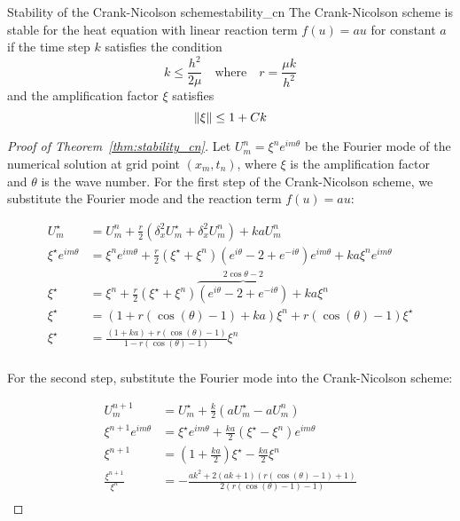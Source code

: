 \begin{theorem}{Stability of the Crank-Nicolson scheme}{stability_cn}
  The Crank-Nicolson scheme is stable for the heat equation with linear reaction term \(f(u) = au\) for constant \(a\) if the time step \(k\) satisfies the condition
  \[
    k \leq \frac{h^2}{2\mu} \quad \text{where} \quad r = \frac{\mu k}{h^2}
  \]
  and the amplification factor \(\xi\) satisfies
  \[
    \lVert\xi\rVert \leq 1 + Ck
  \]
\end{theorem}
\begin{proof}[Proof of Theorem~\ref{thm:stability_cn}]
  Let \(U_m^n = \xi^n e^{i m \theta}\) be the Fourier mode of the numerical solution at grid point \((x_m, t_n)\), where \(\xi\) is the amplification factor and \(\theta\) is the wave number.
  For the first step of the Crank-Nicolson scheme, we substitute the Fourier mode and the reaction term \(f(u) = au\):

  \begin{align*}
    U_m^\star                & = U_m^n + \frac{r}{2} (\delta_x^2 U_m^\star + \delta_x^2 U_m^n) + k a U_m^n                                                                          \\
    \xi^\star e^{i m \theta} & = \xi^n e^{i m \theta} + \frac{r}{2} \left(\xi^\star + \xi^n\right)\left(e^{i\theta} - 2 + e^{-i\theta}\right)e^{im\theta}+ k a \xi^n e^{i m \theta} \\
    \xi^\star                & = \xi^n + \frac{r}{2} \left(\xi^\star + \xi^n \right)\overbrace{\left(e^{i \theta} - 2 + e^{-i \theta}\right)}^{2\cos\theta - 2} + k a \xi^n                                       \\
    \xi^\star                & = (1 + r(\cos(\theta) - 1) + ka) \xi^n + r(\cos(\theta) - 1)\xi^\star                                                                                \\
    \xi^\star                & = \frac{(1 + ka) + r(\cos(\theta) - 1)}{1 - r(\cos(\theta) - 1)} \xi^n                                                                               \\
  \end{align*}

  For the second step, substitute the Fourier mode into the Crank-Nicolson scheme:

  \begin{align*}
    U_m^{n+1}                & = U_m^\star + \frac{k}{2}(a U_m^\star - a U_m^n)                                                                        \\
    \xi^{n+1} e^{i m \theta} & = \xi^\star e^{i m \theta} + \frac{ka}{2}(\xi^\star - \xi^n)e^{i m \theta}                                              \\
    \xi^{n+1}                & = (1 + \frac{ka}{2}) \xi^\star - \frac{ka}{2} \xi^n                                                                     \\
    \frac{\xi^{n+1}}{\xi^n}  & = -\frac{{ak}^2 + 2(a k + 1) (r (\cos(\theta) - 1) + 1)}{2 (r (\cos(\theta) - 1) - 1)}       \tag{Source: Trust me bro} \\
  \end{align*}


\end{proof}
